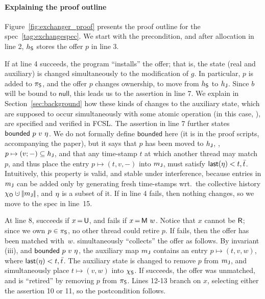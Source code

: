 %

\paragraph{Explaining the proof outline}

Figure~\ref{fig:exchanger_proof} presents the proof outline for the
spec~\eqref{tag:exchangespec}.
%
We start with the precondition, and after allocation in line 2,
$h_{\mathsf{S}}$ stores the offer $p$ in line 3.

If  at line 4 succeeds, the program ``installs'' the offer;
that is, the state (real and auxiliary) is changed simultaneously to
the modification of $g$. In particular, $p$ is added to $\pi_{\mathsf{S}}$, and
the offer $p$ changes ownership, to move from $h_{\mathsf{S}}$ to $h_{\mathsf{J}}$.
Since $b$ will be bound to $\mathsf{null}$, this leads us to the
assertion in line 7. We explain in Section~\ref{sec:background} how
these kinds of changes to the auxiliary state, which are supposed to
occur simultaneously with some atomic operation (in this case,
), are specified and verified in FCSL. The assertion in line
7 further states $\mathsf{bounded}\ p\ v\ \eta$. We do not formally
define $\mathsf{bounded}$ here (it is in the proof scripts,
accompanying the paper), but it says that $p$ has been moved to
$h_{\mathsf{J}}$, \ie, $p \mapsto (v; -) \subseteq h_{\mathsf{J}}$, and that any
time-stamp $t$ at which another thread may match $p$, and thus place
the entry $p \mapsto (t, v,-)$ into ${m_{\mathsf{J}}}$, must satisfy
$\mathsf{last}(\eta) < t, \bar{t}$. Intuitively, this property is
valid, and stable under interference, because entries in ${m_{\mathsf{J}}}$
can be added only by generating fresh time-stamps wrt.~the collective
history $\histo \hunion \mygather{\pending}$, and $\eta$ is a subset
of it.
%
If  in line 4 fails, then nothing changes, so we move to the
spec in line~15.

At line 8,  succeeds if $x\,{=}\,{\mathsf{U}}$, and fails if
$x\,{=}\,{\mathsf{M}\ w}$. Notice that $x$ cannot be ${\mathsf{R}}$; since we
own $p \in \pi_{\mathsf{S}}$, no other thread could retire $p$.
%
If  fails, then the offer has been matched with~$w$. 
simultaneously ``collects'' the offer as follows. By invariant (iii),
and $\mathsf{bounded}\ p\ v\ \eta$, the auxiliary map ${m_{\mathsf{J}}}$
contains an entry $p \mapsto (t, v, w)$, where $\mathsf{last}(\eta) <
t, \bar{t}$. The auxiliary state is changed to remove $p$ from
${m_{\mathsf{J}}}$, and simultaneously place $t \mapsto (v, w)$ into $\chi_{\mathsf{S}}$.
%
If  succeeds, the offer was unmatched, and is ``retired'' by
removing $p$ from $\pi_{\mathsf{S}}$.
%
Lines 12-13 branch on $x$, selecting either the assertion 10 or 11, so
the postcondition follows.

